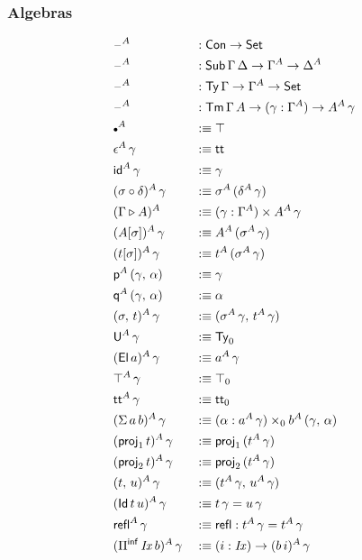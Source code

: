 \documentclass[12pt,a4paper,twoside,openany]{book}
\theoremstyle{remark}
\theoremstyle{definition}
\theoremstyle{theorem}
\newcommand{\mi}[1]{\mathit{#1}}
\newcommand{\refl}{\mathsf{refl}}
\newcommand{\id}{\mathsf{id}}
\newcommand{\Con}{\mathsf{Con}}
\newcommand{\Sub}{\mathsf{Sub}}
\newcommand{\Tm}{\mathsf{Tm}}
\newcommand{\Ty}{\mathsf{Ty}}
\newcommand{\U}{\mathsf{U}}
\newcommand{\El}{\mathsf{El}}
\newcommand{\Id}{\mathsf{Id}}
\newcommand{\proj}{\mathsf{proj}}
\renewcommand{\tt}{\mathsf{tt}}
\newcommand{\blank}{\mathord{\hspace{1pt}\text{--}\hspace{1pt}}}
\newcommand{\Set}{\mathsf{Set}}
\newcommand{\ext}{\triangleright}
\newcommand{\emptycon}{\scaleobj{.75}\bullet}
\newcommand{\Piinf}{\Pi^{\mathsf{inf}}}
\newcommand{\p}{\mathsf{p}}
\newcommand{\q}{\mathsf{q}}
\newcommand{\defn}{:\equiv}
\begin{document}
\subsubsection{Algebras}
\vspace{-0.5em}
\begin{alignat*}{3}
  &\blank^A &&: \Con \to \Set\\
  &\blank^A &&: \Sub\,\Gamma\,\Delta \to \Gamma^A \to \Delta^A\\
  &\blank^A &&: \Ty\,\Gamma \to \Gamma^A \to \Set\\
  &\blank^A &&: \Tm\,\Gamma\,A \to (\gamma : \Gamma^A) \to A^A\,\gamma\\
  &\emptycon^A &&\defn \top\\
  &\epsilon^A\,\gamma &&\defn \tt\\
  &\id^A\,\gamma &&\defn \gamma\\
  &(\sigma \circ \delta)^A\,\gamma &&\defn \sigma^A\,(\delta^A\,\gamma)\\
  &(\Gamma \ext A)^A &&\defn (\gamma : \Gamma^A) \times A^A\,\gamma\\
  &(A[\sigma])^A\,\gamma &&\defn A^A\,(\sigma^A\,\gamma)\\
  &(t[\sigma])^A\,\gamma &&\defn t^A\,(\sigma^A\,\gamma)\\
  &\p^A\,(\gamma,\,\alpha) &&\defn \gamma\\
  &\q^A\,(\gamma,\,\alpha) &&\defn \alpha\\
  &(\sigma,\,t)^A\,\gamma &&\defn (\sigma^A\,\gamma,\,t^A\,\gamma)\\
  &\U^A\,\gamma &&\defn \Ty_0\\
  &(\El\,a)^A\,\gamma &&\defn a^A\,\gamma\\
  &\top^A\,\gamma &&\defn \top_0\\
  &\tt^A\,\gamma &&\defn \tt_0\\
  &(\Sigma\,a\,b)^A\,\gamma &&\defn (\alpha : a^A\,\gamma) \times_0 b^A\,(\gamma,\,\alpha)\\
  &(\proj_1\,t)^A\,\gamma &&\defn \proj_1\,(t^A\,\gamma)\\
  &(\proj_2\,t)^A\,\gamma &&\defn \proj_2\,(t^A\,\gamma)\\
  &(t,\,u)^A\,\gamma &&\defn (t^A\,\gamma,\,u^A\,\gamma)\\
  &(\Id\,t\,u)^A\,\gamma &&\defn t\,\gamma = u\,\gamma\\
  &\refl^A\,\gamma &&\defn \refl : t^A\,\gamma = t^A\,\gamma\\
  &(\Piinf\,\mi{Ix}\,b)^A\,\gamma &&\defn (i : \mi{Ix}) \to (b\,i)^A\,\gamma\\

\end{alignat*}
\end{document}
